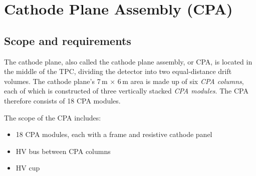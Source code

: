 


\section{Cathode Plane Assembly (CPA)}
\label{sec:cpa}

\subsection{Scope and requirements}

The cathode plane, also called the cathode plane assembly, or CPA, is located in the middle of the TPC, dividing the detector into two equal-distance drift volumes. The cathode plane's 7\,m $\times$ 6\,m area is made up of six \textit{CPA columns}, each of which is constructed of three vertically stacked \textit{CPA modules}. The CPA therefore consists of 18 CPA modules. 

The scope of the CPA includes:

\begin{itemize}
\item 18 CPA modules, each with a frame and resistive cathode panel %
\item HV bus between CPA columns
\item HV cup
\end{itemize}


